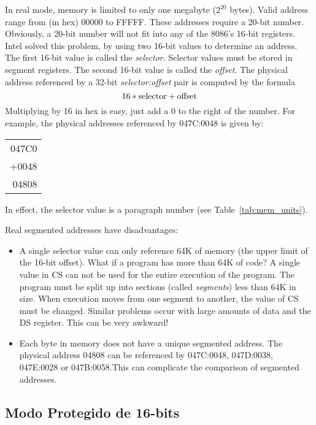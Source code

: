 In  real mode, memory is limited to only one megabyte ($2^{20}$ bytes).
Valid
address range from (in hex) 00000 to FFFFF.\@  %
These addresses require a 20-bit number. Obviously, a 20-bit number will not
fit into any of the 8086's 16-bit registers. Intel solved this problem, by
using two 16-bit values to determine an address. The first 16-bit value is called
the \emph{selector}. Selector values must be stored in segment registers. The
second 16-bit value is called the \emph{offset}. The physical address
referenced by a 32-bit \emph{selector:offset} pair is computed by the formula
\[ 16 * {\rm selector} + {\rm offset} \]
Multiplying by 16 in hex is easy, just add a 0 to the right of the number. For
example, the physical addresses referenced by 047C:0048 is given by:
\begin{center}
\begin{tabular}{r}
047C0 \\
+0048 \\
\hline
04808 \\
\end{tabular}
\end{center}
In effect, the selector value is a paragraph number
(see Table~\ref{tab:mem_units}).

Real segmented addresses have disadvantages:
\begin{itemize}
\item A single selector value can only reference 64K of memory (the
upper limit of the 16-bit offset). What if a program has more than 64K
of code? A single value in CS can not be used for the entire execution
of the program.  The program must be split up into sections (called
\emph{segments}) less than 64K in size. When
execution moves from one segment to another, the value of CS must be
changed. Similar problems occur with large amounts of data and the DS
register. This can be very awkward!

\item Each byte in memory does not have a unique segmented address. The
physical address 04808 can be referenced by 047C:0048, 047D:0038, 047E:0028
or 047B:0058.\@ This can complicate the comparison of segmented addresses.

\end{itemize}

\subsection{Modo Protegido de 16-bits \label{16modo_prot} }

